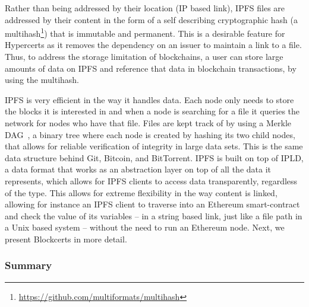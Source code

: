 Rather than being addressed by their location (IP based link), IPFS files are addressed by their content in the form of a self describing cryptographic hash (a multihash\footnote{\url{https://github.com/multiformats/multihash}}) that is immutable and permanent. This is a desirable feature for Hypercerts as it removes the dependency on an issuer to maintain a link to a file. Thus, to address the storage limitation of blockchains, a user can store large amounts of data on IPFS and reference that data in blockchain transactions, by using the multihash.

IPFS is very efficient in the way it handles data. Each node only needs to store the blocks it is interested in and when a node is searching for a file it queries the network for nodes who have that file. Files are kept track of by using a Merkle DAG~\cite{Merkle:1987jk}, a binary tree where each node is created by hashing its two child nodes, that allows for reliable verification of integrity in large data sets. This is the same data structure behind Git, Bitcoin, and BitTorrent. IPFS is built on top of IPLD, a data format that works as an abstraction layer on top of all the data it represents, which allows for IPFS clients to access data transparently, regardless of the type. This allows for extreme flexibility in the way content is linked, allowing for instance an IPFS client to traverse into an Ethereum smart-contract and check the value of its variables -- in a string based link, just like a file path in a Unix based system -- without the need to run an Ethereum node. Next, we present Blockcerts in more detail.

\subsubsection{Summary}
\label{rel:ipfs}


